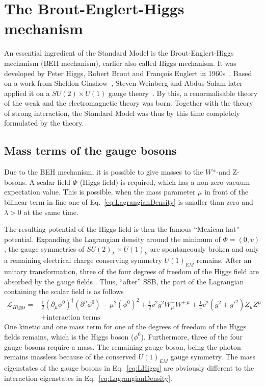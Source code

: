\section{The Brout-Englert-Higgs mechanism}
\label{sec:HiggsMechanism}
An essential ingredient of the Standard Model is the Brout-Englert-Higgs mechanism (BEH mechanism), earlier also called Higgs mechanism.
It was developed by Peter Higgs, Robert Brout and Fran\c{c}ois Englert in 1960s~\cite{bib:HiggsMechanism_Brout_Englert,bib:Higgs_Prediction,bib:Higgs_Prediction_2,bib:HiggsMechanism_Guralnik_Hagen_Kibble,bib:HiggsMechanism_Higgs_1966,bib:HiggsMechanism_Kibble_1967}. Based on a work from Sheldon Glashow~\cite{bib:HiggsMechanism_Glashow_1961}, Steven Weinberg and Abdus Salam later applied it on a $SU(2) \times U(1)$ gauge theory~\cite{bib:HiggsMechanism_Weinberg_1967,bib:HiggsMechanism_Salam_1968}.
By this, a renormalisable theory of the weak and the electromagnetic theory was born.
Together with the theory of strong interaction, the Standard Model was thus by this time completely formulated by the theory.

\subsection*{Mass terms of the gauge bosons}

Due to the BEH mechanism, it is possible to give masses to the $W^{\pm}$-and Z-bosons.
A scalar field $\Phi$ (Higgs field) is required, which has a non-zero vacuum expectation value.
This is possible, when the mass parameter $\mu$ in front of the bilinear term in line one of Eq.~\eqref{eq:LagrangianDensity} is smaller than zero and $\lambda>0$ at the same time.

The resulting potential of the Higgs field is then the famous ``Mexican hat'' potential.
Expanding the Lagrangian density around the minimum of $\Phi = \left( 0,v \right)$, the gauge symmetries of $SU(2)_L \times U(1)_Y$ are spontaneously broken and only a remaining electrical charge conserving symmetry $U(1)_{EM}$ remains.
After an unitary transformation, three of the four degrees of freedom of the Higgs field are absorbed by the gauge fields .
Thus, ``after'' SSB, the part of the Lagrangian containing the scalar field is as follows
\begin{equation}
\begin{split}
\mathcal{L}_{Higgs} =& \frac{1}{2} \left( \partial_{\mu} \phi^0 \right)^{\dagger} \left( \partial^{\mu} \phi^0 \right) - \mu^2 \left(\phi^0\right)^2 + \frac{1}{2} v^2 g^2 W_{\mu}^- W^{+\,\mu}
                    + \frac{1}{4} v^2 \left(g^2 + g'^2  \right)  Z_{\mu} Z^{\mu}\\
  &+ \text{interaction terms}
\end{split}
\label{eq:LHiggs}
\end{equation}
One kinetic and one mass term for one of the degrees of freedom of the Higgs fields remains, which is the Higgs boson ($\phi^0$).
Furthermore, three of the four gauge bosons require a mass.
The remaining gauge boson, being the photon remains massless because of the conserved $U(1)_{EM}$ gauge symmetry.
The mass eigenstates of the gauge bosons in Eq.~\eqref{eq:LHiggs} are obviously different to the interaction eigenstates in Eq.~\eqref{eq:LagrangianDensity}.

